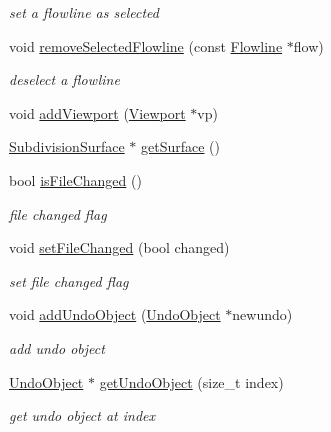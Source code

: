 \begin{DoxyCompactItemize}
\begin{DoxyCompactList}\small\item\em set a flowline as selected \end{DoxyCompactList}\item 
void \hyperlink{classShipCAD_1_1ShipCADModel_ad16bba5c648dec8cddfe23ed9b07615a}{remove\-Selected\-Flowline} (const \hyperlink{classShipCAD_1_1Flowline}{Flowline} $\ast$flow)
\begin{DoxyCompactList}\small\item\em deselect a flowline \end{DoxyCompactList}\item 
void \hyperlink{classShipCAD_1_1ShipCADModel_a6d868bbb71f72c46e6827adeed8afc4b}{add\-Viewport} (\hyperlink{classShipCAD_1_1Viewport}{Viewport} $\ast$vp)
\item 
\hyperlink{classShipCAD_1_1SubdivisionSurface}{Subdivision\-Surface} $\ast$ \hyperlink{classShipCAD_1_1ShipCADModel_a6941ad7a2b167419e844823fa8461019}{get\-Surface} ()
\item 
bool \hyperlink{classShipCAD_1_1ShipCADModel_a2cf41d2e7463763c81c7850fe953437e}{is\-File\-Changed} ()
\begin{DoxyCompactList}\small\item\em file changed flag \end{DoxyCompactList}\item 
void \hyperlink{classShipCAD_1_1ShipCADModel_a98ebcb64c5c759cbd0ae6e817b7168b2}{set\-File\-Changed} (bool changed)
\begin{DoxyCompactList}\small\item\em set file changed flag \end{DoxyCompactList}\item 
void \hyperlink{classShipCAD_1_1ShipCADModel_ab79232c9ce03bda04f47ff614f87cea4}{add\-Undo\-Object} (\hyperlink{classShipCAD_1_1UndoObject}{Undo\-Object} $\ast$newundo)
\begin{DoxyCompactList}\small\item\em add undo object \end{DoxyCompactList}\item 
\hyperlink{classShipCAD_1_1UndoObject}{Undo\-Object} $\ast$ \hyperlink{classShipCAD_1_1ShipCADModel_a0acb4ae206e2caee0f87ebd229b7c90b}{get\-Undo\-Object} (size\-\_\-t index)
\begin{DoxyCompactList}\small\item\em get undo object at index \end{DoxyCompactList}\item 

\end{DoxyCompactItemize}
